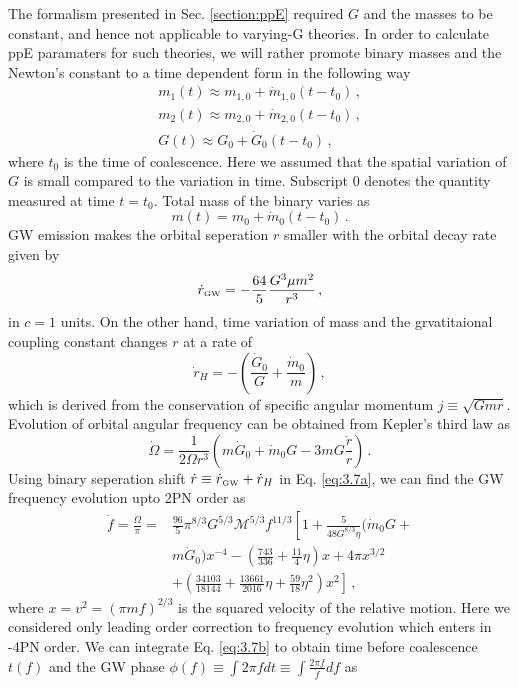 \documentclass[prd,twocolumn,nofootinbib]{revtex4-1}
\newcommand{\GW}{{\mbox{\tiny GW}}}
\begin{document}
The formalism presented in Sec. \ref{section:ppE} required $G$ and the masses to be constant, and hence not applicable to varying-G theories. In order to calculate ppE paramaters for such theories, we will rather promote binary masses and the Newton's constant to a time dependent form in the following way
 \begin{eqnarray}\label{eq:3.7a2}
 m_1(t)\approx m_{1,0}+\dot{m}_{1,0}(t-t_0)\,, \\
 \label{eq:3.7a3}  m_2(t)\approx m_{2,0}+\dot{m}_{2,0}(t-t_0)\,, \\
   \label{eq:3.7a4}  G(t)\approx  G_0+\dot{G}_0(t-t_0)\, , 
 \end{eqnarray}
where $t_0$ is the time of coalescence. Here we assumed that the spatial variation of $G$ is small compared to the variation in time. Subscript $0$ denotes the quantity measured at time $t=t_0$. Total mass of the binary varies as
 \begin{equation}
 m(t)=m_0+\dot{m}_0(t-t_0)\,.
 \end{equation}
 GW emission makes the orbital seperation $r$ smaller with the orbital decay rate given by \cite{PhysRevD.49.2658}
 \begin{equation}
 \dot{r}_{\GW}=-\frac{64}{5}\frac{G^3 \mu m^2}{r^3}\,,
 \end{equation}
 in $c=1$ units. On the other hand, time variation of mass and the grvatitaional coupling constant changes $r$ at a rate of 
 \begin{equation}
 \dot{r}_H=-\left(\frac{\dot{G}_0}{G}+\frac{\dot{m}_0}{m}\right)\,,
 \end{equation}
 which is derived from the conservation of specific angular momentum $j\equiv\sqrt{Gmr}$. Evolution of orbital angular frequency can be obtained from Kepler's third law as
 \begin{equation}\label{eq:3.7a}
 \dot{\Omega}=\frac{1}{2\Omega r^3}\left(m\dot{G}_0+\dot{m}_0G-3mG\frac{\dot{r}}{r}\right)\,.
 \end{equation}
Using binary seperation shift $\dot{r}\equiv \dot{r}_{\GW}+\dot{r}_H$ in Eq. \eqref{eq:3.7a}, we can find the GW frequency evolution upto 2PN order as
\begin{align} \label{eq:3.7b}
 \dot{f}=\frac{\dot{\Omega}}{\pi}=& \frac{96}{5}\pi^{8/3}G^{5/3}\mathcal{M}^{5/3}f^{11/3}\left[1+\frac{5}{48 G^{8/3}\eta}(\dot{m}_0G+ \right.\nonumber\\ & \left. m\dot{G}_0)x^{-4} -\left(\frac{743}{336}+\frac{11}{4}\eta\right)x+4\pi x^{3/2}\right.\nonumber\\ & \left. + \left(\frac{34103}{18144}+\frac{13661}{2016}\eta+\frac{59}{18}\eta^2\right)x^2 \right]\,,
\end{align}
where $x=v^2=(\pi m f)^{2/3}$ is the squared velocity of the relative motion. Here we considered only leading order correction to frequency evolution which enters in -4PN order. We can integrate Eq. \eqref{eq:3.7b} to obtain time before coalescence $t(f)$ and the GW phase $\phi(f)\equiv \int 2 \pi f dt \equiv \int\frac{2\pi f}{\dot{f}}df$ as
\end{document}
